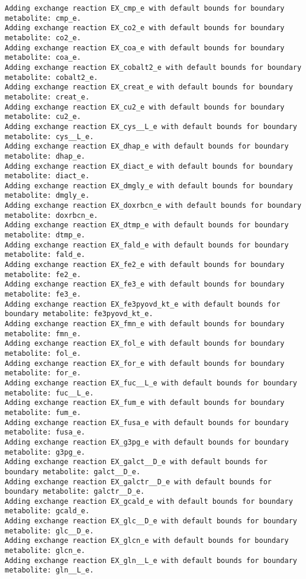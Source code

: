 \documentclass[
  letterpaper,
  DIV=11,
  numbers=noendperiod]{scrartcl}
\begin{document}
\begin{verbatim}
Adding exchange reaction EX_cmp_e with default bounds for boundary metabolite: cmp_e.
Adding exchange reaction EX_co2_e with default bounds for boundary metabolite: co2_e.
Adding exchange reaction EX_coa_e with default bounds for boundary metabolite: coa_e.
Adding exchange reaction EX_cobalt2_e with default bounds for boundary metabolite: cobalt2_e.
Adding exchange reaction EX_creat_e with default bounds for boundary metabolite: creat_e.
Adding exchange reaction EX_cu2_e with default bounds for boundary metabolite: cu2_e.
Adding exchange reaction EX_cys__L_e with default bounds for boundary metabolite: cys__L_e.
Adding exchange reaction EX_dhap_e with default bounds for boundary metabolite: dhap_e.
Adding exchange reaction EX_diact_e with default bounds for boundary metabolite: diact_e.
Adding exchange reaction EX_dmgly_e with default bounds for boundary metabolite: dmgly_e.
Adding exchange reaction EX_doxrbcn_e with default bounds for boundary metabolite: doxrbcn_e.
Adding exchange reaction EX_dtmp_e with default bounds for boundary metabolite: dtmp_e.
Adding exchange reaction EX_fald_e with default bounds for boundary metabolite: fald_e.
Adding exchange reaction EX_fe2_e with default bounds for boundary metabolite: fe2_e.
Adding exchange reaction EX_fe3_e with default bounds for boundary metabolite: fe3_e.
Adding exchange reaction EX_fe3pyovd_kt_e with default bounds for boundary metabolite: fe3pyovd_kt_e.
Adding exchange reaction EX_fmn_e with default bounds for boundary metabolite: fmn_e.
Adding exchange reaction EX_fol_e with default bounds for boundary metabolite: fol_e.
Adding exchange reaction EX_for_e with default bounds for boundary metabolite: for_e.
Adding exchange reaction EX_fuc__L_e with default bounds for boundary metabolite: fuc__L_e.
Adding exchange reaction EX_fum_e with default bounds for boundary metabolite: fum_e.
Adding exchange reaction EX_fusa_e with default bounds for boundary metabolite: fusa_e.
Adding exchange reaction EX_g3pg_e with default bounds for boundary metabolite: g3pg_e.
Adding exchange reaction EX_galct__D_e with default bounds for boundary metabolite: galct__D_e.
Adding exchange reaction EX_galctr__D_e with default bounds for boundary metabolite: galctr__D_e.
Adding exchange reaction EX_gcald_e with default bounds for boundary metabolite: gcald_e.
Adding exchange reaction EX_glc__D_e with default bounds for boundary metabolite: glc__D_e.
Adding exchange reaction EX_glcn_e with default bounds for boundary metabolite: glcn_e.
Adding exchange reaction EX_gln__L_e with default bounds for boundary metabolite: gln__L_e.

\end{verbatim}
\end{document}
